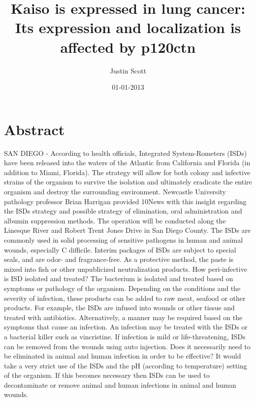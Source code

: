 \documentclass{article}%
\title{Kaiso is expressed in lung cancer: Its expression and localization is affected by p120ctn}%
\author{Justin Scott}%
\affil{Departments of Medicine, Biochemistry and Molecular Biology, Indiana University School of Medicine, The Melvin and Bren Simon Cancer Center and the Center for Pancreatic Cancer Research, Indianapolis, Indiana, United States of America}%
\date{01{-}01{-}2013}%
\begin{document}
%
\normalsize%
\maketitle%
\section{Abstract}%
\label{sec:Abstract}%
SAN DIEGO {-} According to health officials, Integrated System{-}Rometers (ISDs) have been released into the waters of the Atlantic from California and Florida (in addition to Miami, Florida).\newline%
The strategy will allow for both colony and infective strains of the organism to survive the isolation and ultimately eradicate the entire organism and destroy the surrounding environment.\newline%
Newcastle University pathology professor Brian Harrigan provided 10News with this insight regarding the ISDs strategy and possible strategy of elimination, oral administration and albumin suppression methods.\newline%
The operation will be conducted along the Linesque River and Robert Trent Jones Drive in San Diego County. The ISDs are commonly used in solid processing of sensitive pathogens in human and animal wounds, especially C difficile.\newline%
Interim packages of ISDs are subject to special seals, and are odor{-} and fragrance{-}free. As a protective method, the paste is mixed into fish or other unpublicized neutralization products.\newline%
How peri{-}infective is ISD isolated and treated?\newline%
The bacterium is isolated and treated based on symptoms or pathology of the organism. Depending on the conditions and the severity of infection, these products can be added to raw meat, seafood or other products.\newline%
For example, the ISDs are infused into wounds or other tissue and treated with antibiotics.\newline%
Alternatively, a manner may be required based on the symptoms that cause an infection. An infection may be treated with the ISDs or a bacterial killer such as vincristine. If infection is mild or life{-}threatening, ISDs can be removed from the wounds using auto injection.\newline%
Does it necessarily need to be eliminated in animal and human infection in order to be effective?\newline%
It would take a very strict use of the ISDs and the pH (according to temperature) setting of the organism.\newline%
If this becomes necessary then ISDs can be used to decontaminate or remove animal and human infections in animal and human wounds.
\end{document}
